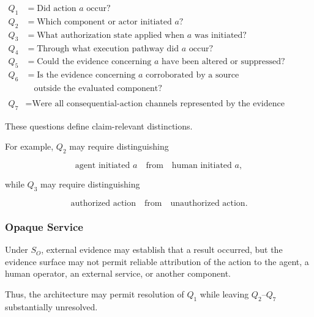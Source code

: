\begin{align*}
  Q_1 & = \text{Did action }a\text{ occur?}                                                  \\
  Q_2 & = \text{Which component or actor initiated }a\text{?}                                \\
  Q_3 & = \text{What authorization state applied when }a\text{ was initiated?}               \\
  Q_4 & = \text{Through what execution pathway did }a\text{ occur?}                          \\
  Q_5 & = \text{Could the evidence concerning }a\text{ have been altered or suppressed?}     \\
  Q_6 & = \text{Is the evidence concerning }a\text{ corroborated by a source}                \\
      & \quad\text{outside the evaluated component?}                                         \\                                                        \\
  Q_7 & = \text{Were all consequential-action channels represented by the evidence surface?}
\end{align*}

These questions define claim-relevant distinctions.

For example, \(Q_2\) may require distinguishing

\begin{equation}
  \text{agent initiated }a
  \quad\text{from}\quad
  \text{human initiated }a,
\end{equation}

while \(Q_3\) may require distinguishing

\begin{equation}
  \text{authorized action}
  \quad\text{from}\quad
  \text{unauthorized action}.
\end{equation}

\subsubsection{Opaque Service}

Under \(S_O\), external evidence may establish that a result occurred,
but the evidence surface may not permit reliable attribution of the
action to the agent, a human operator, an external service, or another
component.

Thus, the architecture may permit resolution of \(Q_1\) while leaving
\(Q_2\)--\(Q_7\) substantially unresolved.

